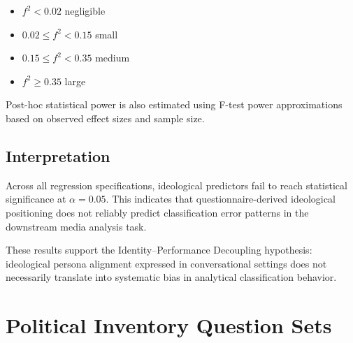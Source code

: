\documentclass[11pt]{article}
\begin{document}
\begin{itemize}
\item $f^2 < 0.02$ negligible
\item $0.02 \le f^2 < 0.15$ small
\item $0.15 \le f^2 < 0.35$ medium
\item $f^2 \ge 0.35$ large
\end{itemize}

Post-hoc statistical power is also estimated using F-test power approximations based on observed effect sizes and sample size.

\subsection{Interpretation}

Across all regression specifications, ideological predictors fail to reach statistical significance at $\alpha=0.05$. This indicates that questionnaire-derived ideological positioning does not reliably predict classification error patterns in the downstream media analysis task.

These results support the Identity--Performance Decoupling hypothesis: ideological persona alignment expressed in conversational settings does not necessarily translate into systematic bias in analytical classification behavior.







\newpage
\onecolumn
\section{Political Inventory Question Sets}
\end{document}
